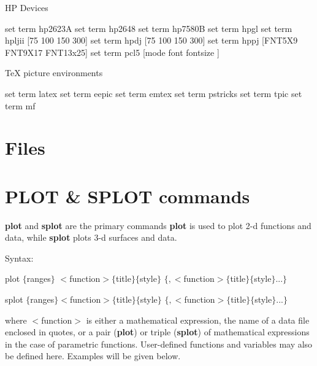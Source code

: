 HP Devices

                  {set term hp2623A}
                         {set term hp2648}
            {set term hp7580B}
        {set term hpgl}
   {set term hpljii [75 100 150 300]}
 {set term hpdj [75 100 150 300]}
                                {set term hppj [FNT5X9 FNT9X17 FNT13x25]}
                {set term pcl5 [mode font fontsize ]}

TeX picture environments

                 {set term latex}
  {set term eepic}
        {set term emtex}
  {set term pstricks}
    {set term tpic}
                    {set term mf}


\endindentedkeys

\section{Files}


\section{PLOT \& SPLOT commands}


{\bf plot} and {\bf splot} are the primary commands
{\bf plot} is used to plot 2-d
functions and data, while {\bf splot} plots 3-d surfaces and data.

Syntax:

        plot $\{$ranges$\}$ $<$function$> \{$title$\} \{$style$\}$
                    $\{, <$function$> \{$title$\} \{$style$\}...\}$

        splot $\{$ranges$\} <$function$> \{$title$\} \{$style$\}$
                    $\{, <$function$> \{$title$\} \{$style$\}...\}$

where $<$function$>$ is either a mathematical expression, the name of a
data file enclosed in quotes, or a pair ({\bf plot}) or triple ({\bf splot})
of mathematical expressions in the case of parametric functions.
User-defined functions and variables may also be defined here.
Examples will be given below.

